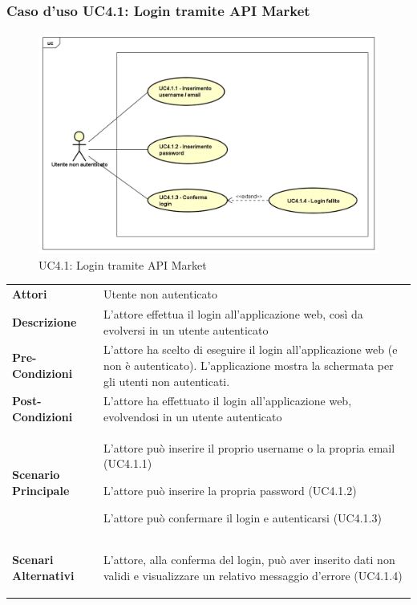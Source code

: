 \newpage
\subsubsection{Caso d'uso UC4.1: Login tramite API Market}
\label{UC4_1}
\begin{figure}[!htbp]
	\centering
	\includegraphics[scale=0.45]{UML/UC4_1.png}
	\caption{UC4.1: Login tramite API Market}
\end{figure}

\begin{tabular}{ l | p{11cm}}
	\hline
	\rowcolor{Gray}
	 \multicolumn{2}{c}{UC4.1 - Login tramite API Market} \\
	 \hline
	\textbf{Attori} & Utente non autenticato \\
	\textbf{Descrizione} & L'attore effettua il login all'applicazione web, così da evolversi in un utente autenticato\\
	\textbf{Pre-Condizioni} & L'attore ha scelto di eseguire il login all'applicazione web (e non è autenticato). L'applicazione mostra la schermata per gli utenti non autenticati. \\
	\textbf{Post-Condizioni} & L'attore ha effettuato il login all'applicazione web, evolvendosi in un utente autenticato \\
	\textbf{Scenario Principale} & 
	\begin{enumerate*}[label=(\arabic*.),itemjoin={\newline}]
		\item L'attore può inserire il proprio username o la propria email (UC4.1.1)
		\item L'attore può inserire la propria password (UC4.1.2)
		\item L'attore può confermare il login e autenticarsi (UC4.1.3)
	\end{enumerate*}\\
	\textbf{Scenari Alternativi} & 
	\begin{enumerate*}[label=(\arabic*.),itemjoin={\newline}]
		\item L'attore, alla conferma del login, può aver inserito dati non validi e visualizzare un relativo messaggio d'errore (UC4.1.4)
	\end{enumerate*}\\
\end{tabular}


